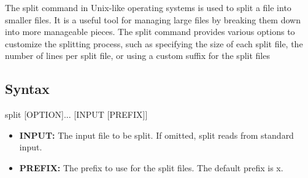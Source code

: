 \documentclass{report}
\begin{document}
    \pagebreak 
    \bigbreak \noindent 
    The split command in Unix-like operating systems is used to split a file into smaller files. It is a useful tool for managing large files by breaking them down into more manageable pieces. The split command provides various options to customize the splitting process, such as specifying the size of each split file, the number of lines per split file, or using a custom suffix for the split files
    \bigbreak \noindent 
    \subsection{Syntax}
    \bigbreak \noindent 
    \begin{bashcode}
    split [OPTION]... [INPUT [PREFIX]]
    \end{bashcode}
    \begin{itemize}
        \item \textbf{INPUT:} The input file to be split. If omitted, split reads from standard input.
        \item \textbf{PREFIX:} The prefix to use for the split files. The default prefix is x.
    \end{itemize}
    \bigbreak \noindent 
\end{document}
